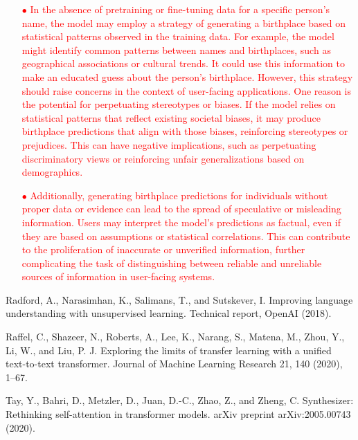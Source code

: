 \documentclass[letterpaper,12pt]{article}
\begin{document}
\begin{itemize}
			\textcolor{red}{
			\begin{itemize}
				\item [$\bullet$]
				In the absence of pretraining or fine-tuning data for a specific person's name, the model may employ a strategy of generating a birthplace based on statistical patterns observed in the training data. For example, the model might identify common patterns between names and birthplaces, such as geographical associations or cultural trends. It could use this information to make an educated guess about the person's birthplace.
				However, this strategy should raise concerns in the context of user-facing applications. One reason is the potential for perpetuating stereotypes or biases. If the model relies on statistical patterns that reflect existing societal biases, it may produce birthplace predictions that align with those biases, reinforcing stereotypes or prejudices. This can have negative implications, such as perpetuating discriminatory views or reinforcing unfair generalizations based on demographics.
				\item [$\bullet$]
				Additionally, generating birthplace predictions for individuals without proper data or evidence can lead to the spread of speculative or misleading information. Users may interpret the model's predictions as factual, even if they are based on assumptions or statistical correlations. This can contribute to the proliferation of inaccurate or unverified information, further complicating the task of distinguishing between reliable and unreliable sources of information in user-facing systems.
			\end{itemize}
			}
	\end{itemize}

		
\renewcommand{\refname}{References}
		
\begin{thebibliography}{00}
			
	\label{cite:b1}
		Radford, A., Narasimhan, K., Salimans, T., and Sutskever, I. Improving language understanding with unsupervised learning. Technical report, OpenAI (2018).
			
	\label{cite:b2}
		Raffel, C., Shazeer, N., Roberts, A., Lee, K., Narang, S., Matena, M., Zhou, Y., Li, W., and Liu, P. J. Exploring the limits of transfer learning with a unified text-to-text transformer. Journal of Machine Learning Research 21, 140 (2020), 1–67.
			
	\label{cite:b3}
		Tay, Y., Bahri, D., Metzler, D., Juan, D.-C., Zhao, Z., and Zheng, C. Synthesizer: Rethinking self-attention in transformer models. arXiv preprint arXiv:2005.00743 (2020).
			
			
			
\end{thebibliography}
		
%		
%		
		
		
	
\end{document}
